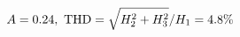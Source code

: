 \documentclass[preview]{standalone}
\begin{document}
\begin{align*}
\special{dvisvgm:raw <g id='unique000'>}A=0.24,\ \text{THD}=\sqrt{H_2^2+H_3^2}/H_1=4.8\%\special{dvisvgm:raw </g>}
\end{align*}
\end{document}
